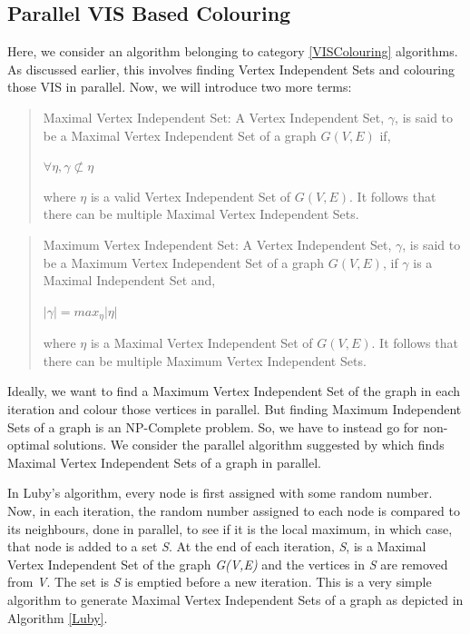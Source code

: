 \documentclass[MTech]{iitmdiss}
\begin{document}
\subsection{Parallel VIS Based Colouring}
Here, we consider an algorithm belonging to category \ref{VISColouring} algorithms. As discussed earlier, this involves finding Vertex Independent Sets and colouring those VIS in parallel. Now, we will introduce two more terms:
\begin{verse}
Maximal Vertex Independent Set: A Vertex Independent Set, $\gamma$, is said to be a Maximal Vertex Independent Set of a graph $G(V,E)$ if,
\begin{center}
$\forall \eta, \gamma \not\subset \eta$ 
\end{center}
where $\eta$ is a valid Vertex Independent Set of $G(V,E)$. It follows that there can be multiple Maximal Vertex Independent Sets.
\end{verse}
\begin{verse}
Maximum Vertex Independent Set: A Vertex Independent Set, $\gamma$, is said to be a Maximum Vertex Independent Set of a graph $G(V,E)$, if $\gamma$ is a Maximal Independent Set and,
\begin{center}
$|\gamma| = max_{\eta}|\eta|$ 
\end{center}
where $\eta$ is a Maximal Vertex Independent Set of $G(V,E)$. It follows that there can be multiple Maximum Vertex Independent Sets.
\end{verse}
Ideally, we want to find a Maximum Vertex Independent Set of the graph in each iteration and colour those vertices in parallel. But finding Maximum Independent Sets of a graph is an NP-Complete problem. So, we have to instead go for non-optimal solutions. We consider the parallel algorithm suggested by \citet{Luby:1985:SPA:22145.22146} which finds Maximal Vertex Independent Sets of a graph in parallel.

In Luby's algorithm, every node is first assigned with some random number. Now, in each iteration, the random number assigned to each node is compared to its neighbours, done in parallel, to see if it is the local maximum, in which case, that node is added to a set \textit{S}. At the end of each iteration, \textit{S}, is a Maximal Vertex Independent Set of the graph \textit{G(V,E)} and the vertices in \textit{S} are removed from \textit{V}. The set is \textit{S} is emptied before a new iteration. This is a very simple algorithm to generate Maximal Vertex Independent Sets of a graph as depicted in Algorithm \ref{Luby}.
\end{document}
